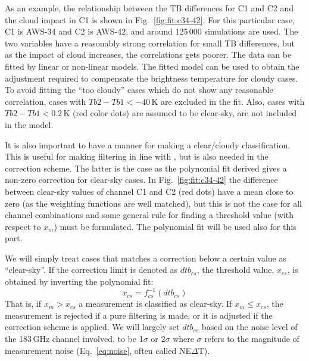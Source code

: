 \documentclass[12pt]{article}
\begin{document}
As an example, the relationship between the TB differences for C1 and C2 and
the cloud impact in C1 is shown in Fig.~\ref{fig:fit:c34-42}. For this
particular case, C1 is AWS-34 and C2 is AWS-42, and around 125\,000 simulations
are used. The two variables have a reasonably strong correlation for small TB
differences, but as the impact of cloud increases, the correlations gets poorer.
The data can be fitted by linear or non-linear models. The fitted model can be
used to obtain the adjustment required to compensate the brightness
temperature for cloudy cases. To avoid fitting the ``too cloudy'' cases which
do not show any reasonable correlation, cases with $Tb2-Tb1< -40$\,K are
excluded in the fit. Also, cases with $Tb2-Tb1 < 0.2$\,K (red color dots) are
assumed to be clear-sky, are not included in the model.

It is also important to have a manner for making a clear/cloudy classification.
This is useful for making filtering in line with \citet{rekha2012potential},
but is also needed in the correction scheme. The latter is the case as the
polynomial fit derived gives a non-zero correction for clear-sky cases. In
Fig.~\ref{fig:fit:c34-42} the difference between clear-sky values of channel C1
and C2 (red dots) have a mean close to zero (as the weighting functions are
well matched), but this is not the case for all channel combinations and some
general rule for finding a threshold value (with respect to $x_m$) must be
formulated. The polynomial fit will be used also for this part.

We will simply treat cases that matches a correction below a certain value as
``clear-sky''. If the correction limit is denoted as $dtb_{cs}$, the threshold
value, $x_{cs}$, is obtained by inverting the polynomial fit:
\begin{equation}
x_{cs} = f_{cs}^{-1}(dtb_{cs}) 
\label{eq:dtb}
\end{equation}
That is, if $x_m>x_{cs}$ a measurement is classified as clear-sky. If
$x_m\leq x_{cs}$, the measurement is rejected if a pure filtering is made, or
it is adjusted if the correction scheme is applied. We will largely set
$dtb_{cs}$ based on the noise level of the 183\,GHz channel involved, to be
1$\sigma$ or 2$\sigma$ where $\sigma$ refers to the magnitude of measurement
noise (Eq.~\ref{eq:noise}, often called NE$\Delta$T).
\end{document}
